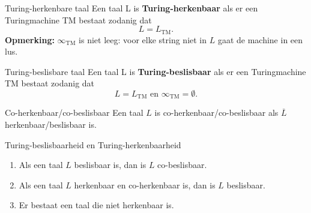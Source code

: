 
\begin{theo}{Turing-herkenbare taal}
    Een taal L is \textbf{Turing-herkenbaar} als er een Turingmachine TM bestaat zodanig dat
    \begin{equation*}
        L = L_{\text{TM}}.
    \end{equation*}
    \textbf{Opmerking:} $\infty_{\text{TM}}$ is niet leeg: voor elke string niet in $L$ gaat de machine in een lus.
\end{theo}

\begin{theo}{Turing-beslisbare taal}
    Een taal L is \textbf{Turing-beslisbaar} als er een Turingmachine TM bestaat zodanig dat
    \begin{equation*}
        L = L_{\text{TM}} \text{ en } \infty_{\text{TM}} = \emptyset.
    \end{equation*}
    \vspace{-0.3cm}
\end{theo}

\begin{theo}{Co-herkenbaar/co-beslisbaar}
    Een taal $L$ is co-herkenbaar/co-beslisbaar als $\overline{L}$ herkenbaar/beslisbaar is.
\end{theo}

\newpage

\begin{lem}{Turing-beslisbaarheid en Turing-herkenbaarheid}
    \begin{enumerate}
        \item Als een taal $L$ beslisbaar is, dan is $L$ co-beslisbaar.
        \item Als een taal $L$ herkenbaar en co-herkenbaar is, dan is $L$ beslisbaar.
        \item Er bestaat een taal die niet herkenbaar is.
    \end{enumerate}
\end{lem}

